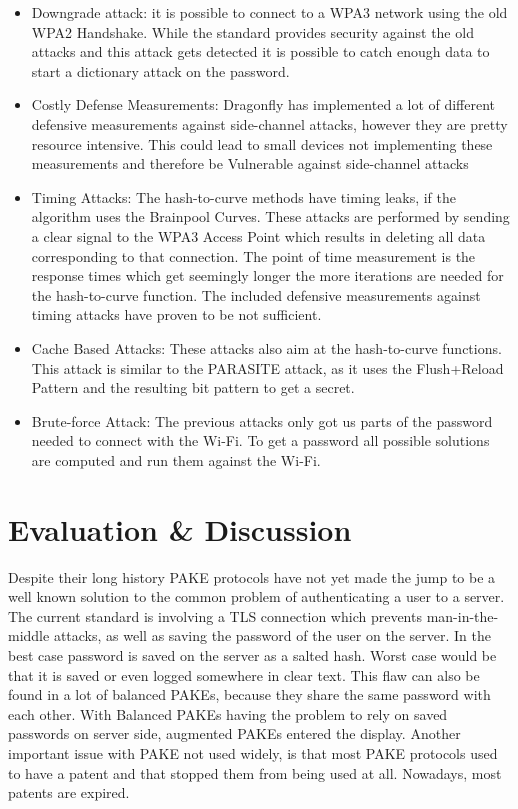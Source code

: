 \documentclass[journal]{IEEEtran}
\begin{document}
\begin{itemize}[]
    \item Downgrade attack: it is possible to connect to a WPA3 network using the old WPA2 Handshake. While the standard provides security against the old attacks and this attack gets detected it is possible to catch enough data to start a dictionary attack on the password.
    \item Costly Defense Measurements: Dragonfly has implemented a lot of different defensive measurements against side-channel attacks, however they are pretty resource intensive. This could lead to small devices not implementing these measurements and therefore be Vulnerable against side-channel attacks  
    \item Timing Attacks: The hash-to-curve methods have timing leaks, if the algorithm uses the Brainpool Curves. These attacks are performed by sending a clear signal to the WPA3 Access Point which results in deleting all data corresponding to that connection. The point of time measurement is the response times which get seemingly longer the more iterations are needed for the hash-to-curve function. 
    The included defensive measurements against timing attacks have proven to be not sufficient.
    \item Cache Based Attacks: These attacks also aim at the hash-to-curve functions. This attack is similar to the PARASITE attack, as it uses the Flush+Reload Pattern and the resulting bit pattern to get a secret.
    \item Brute-force Attack: The previous attacks only got us parts of the password needed to connect with the Wi-Fi. To get a password all possible solutions are computed and run them against the Wi-Fi.
\end{itemize}
\cite{vanhoef2020dragonblood}

\section{Evaluation \& Discussion}
Despite their long history PAKE protocols have not yet made the jump to be a well known solution to the common problem of authenticating a user to a server. 
The current standard is involving a TLS connection which prevents man-in-the-middle attacks, as well as saving the password of the user on the server.
In the best case password is saved on the server as a salted hash. Worst case would be that it is saved or even logged somewhere in clear text.
This flaw can also be found in a lot of balanced PAKEs, because they share the same password with each other.
With Balanced PAKEs having the problem to rely on saved passwords on server side, augmented PAKEs entered the display.
Another important issue with PAKE not used widely, is that most PAKE protocols used to have a patent and that stopped them from being used at all.
Nowadays, most patents are expired.
\end{document}
